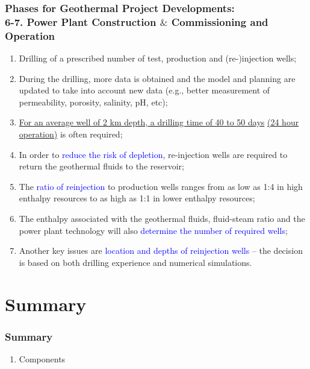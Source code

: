 \documentclass[10pt,compress]{beamer}
\newcommand{\blue}{\textcolor{blue}}
\begin{document}
\begin{frame}
 \frametitle{Phases for Geothermal Project Developments: \\ 6-7. Power Plant Construction $\&$ Commissioning and Operation }
    \begin{enumerate}[{4.}1]%
       \item <1-> Drilling of a prescribed number of test, production and (re-)injection wells;
       \item <2-> During the drilling, more data is obtained and the model and planning are updated to take into account new data (e.g., better measurement of permeability, porosity, salinity, pH, etc);
       \item <3-> \underline{For an average well of 2 km depth, a drilling time of 40 to 50 days} \underline{(24 hour operation)} is often required;
       \item <4-> In order to \blue{reduce the risk of depletion}, re-injection wells are required to return the geothermal fluids to the reservoir; 
       \item <5-> The \blue{ratio of reinjection} to production wells ranges from as low as 1:4 in high enthalpy resources to as high as 1:1 in lower enthalpy resources; 
       \item <6-> The enthalpy associated with the geothermal fluids, fluid-steam ratio and the power plant technology will also \blue{determine the number of required wells};
       \item <7-> Another key issues are \blue{location and depths of reinjection wells} -- the decision is based on both drilling experience and numerical simulations.
    \end{enumerate}
\end{frame}
 







\section{Summary}
\begin{frame}
 \frametitle{Summary}
  \begin{enumerate}
%
     \item <1-> Components 
%
  \end{enumerate}
\end{frame}
\end{document}
